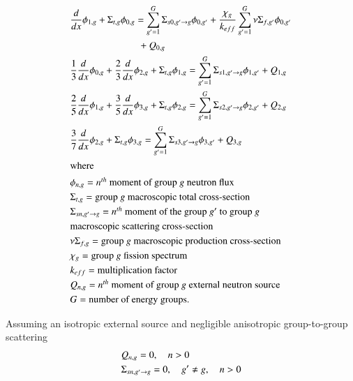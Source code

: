 \documentclass{anstrans}
\begin{document}
\begin{align}
    & \frac{d}{dx} \phi_{1,g} + \Sigma_{t,g} \phi_{0,g} = \sum_{g'=1}^G \Sigma_{s0,g' \rightarrow g} \phi_{0,g'} + \frac{\chi_g}{k_{eff}} \sum_{g'=1}^G \nu\Sigma_{f,g'} \phi_{0,g'} \notag \\ & \quad \quad \quad \quad \quad \quad \quad + Q_{0,g}  \label{eq:P3-0} \\
    & \frac{1}{3} \frac{d}{dx} \phi_{0,g} + \frac{2}{3}\frac{d}{dx}\phi_{2,g} + \Sigma_{t,g} \phi_{1,g} = \sum_{g'=1}^G \Sigma_{s1,g' \rightarrow g} \phi_{1,g'} + Q_{1,g} \label{eq:P3-1} \\
    & \frac{2}{5} \frac{d}{dx}\phi_{1,g} + \frac{3}{5}\frac{d}{dx}\phi_{3,g} + \Sigma_{t,g} \phi_{2,g} = \sum_{g'=1}^G \Sigma_{s2,g' \rightarrow g} \phi_{2,g'} + Q_{2,g} \label{eq:P3-2} \\
    & \frac{3}{7}\frac{d}{dx}\phi_{2,g} + \Sigma_{t,g} \phi_{3,g} = \sum_{g'=1}^G \Sigma_{s3,g' \rightarrow g} \phi_{3,g'} + Q_{3,g} \label{eq:P3-3} \\
    \intertext{where}
    & \phi_{n,g} = \mbox{$n^{th}$ moment of group $g$ neutron flux}  \notag \\ %
    & \Sigma_{t,g} = \mbox{group $g$ macroscopic total cross-section}  \notag \\ %
	& \Sigma_{sn,g' \rightarrow g} = \mbox{$n^{th}$ moment of the group $g'$ to group $g$} \notag \\
	& \mbox{macroscopic scattering cross-section}  \notag \\ %
	& \nu\Sigma_{f,g} = \mbox{group $g$ macroscopic production cross-section}  \notag \\ %
	& \chi_{g} = \mbox{group $g$ fission spectrum}  \notag \\ %
	& k_{eff} = \mbox{multiplication factor}  \notag \\ %
	& Q_{n,g} = \mbox{$n^{th}$ moment of group $g$ external neutron source}  \notag \\  %
	& G = \mbox{number of energy groups}.  \notag %
\end{align}

Assuming an isotropic external source and negligible anisotropic group-to-group scattering \cite{brantley_simplifiedP3_2000}
\begin{align}
	& Q_{n,g} = 0, \quad n > 0 \notag \\
	& \Sigma_{sn,g' \rightarrow g} = 0, \quad g' \ne g, \quad n > 0 \notag
\end{align}
\end{document}
